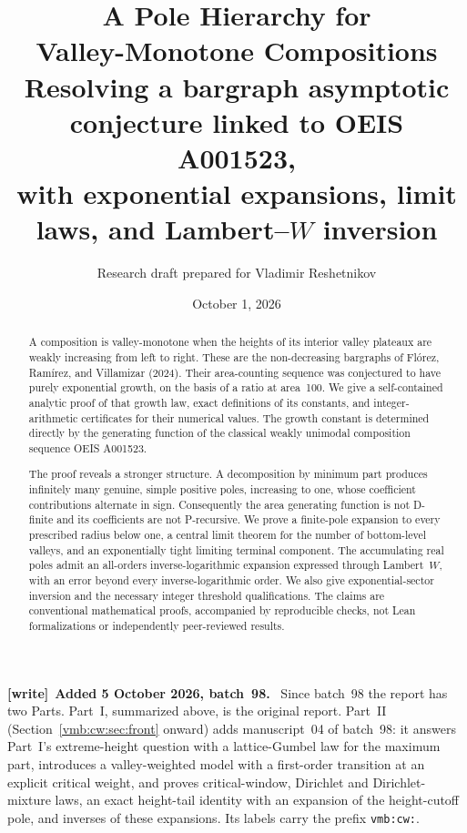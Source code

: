 \documentclass[11pt,a4paper]{article}
\title{\textbf{A Pole Hierarchy for\\Valley-Monotone Compositions}\\[7pt]
\large Resolving a bargraph asymptotic conjecture linked to OEIS A001523,\\
with exponential expansions, limit laws, and Lambert--\(W\) inversion}
\author{Research draft prepared for Vladimir Reshetnikov}
\date{October 1, 2026}
\numberwithin{equation}{section}
\theoremstyle{definition}\newtheorem{definition}[theorem]{Definition}
\theoremstyle{remark}\newtheorem{remark}[theorem]{Remark}
\newenvironment{writenote}[1][]{\par\smallskip\begingroup\small
 \noindent\textbf{[write]}\if\relax\detokenize{#1}\relax\else~\textbf{#1.}\fi\ }%
 {\par\endgroup\smallskip}
\begin{document}
\maketitle
\begin{abstract}
A composition is valley-monotone when the heights of its interior valley
plateaux are weakly increasing from left to right. These are the
non-decreasing bargraphs of Fl\'orez, Ram\'irez, and Villamizar (2024).
Their area-counting sequence was conjectured to have purely exponential
growth, on the basis of a ratio at area~100. We give a self-contained
analytic proof of that growth law, exact definitions of its constants,
and integer-arithmetic certificates for their numerical values.
The growth constant is determined directly by the generating function
of the classical weakly unimodal composition sequence OEIS A001523.

The proof reveals a stronger structure. A decomposition by minimum part
produces infinitely many genuine, simple positive poles, increasing to
one, whose coefficient contributions alternate in sign. Consequently the
area generating function is not D-finite and its coefficients are not
P-recursive. We prove a finite-pole expansion to every prescribed radius
below one, a central limit theorem for the number of bottom-level valleys,
and an exponentially tight limiting terminal component. The accumulating
real poles admit an all-orders inverse-logarithmic expansion expressed
through Lambert~\(W\), with an error beyond every inverse-logarithmic order.
We also give exponential-sector inversion and the necessary integer
threshold qualifications. The claims are conventional mathematical
proofs, accompanied by reproducible checks, not Lean formalizations or
independently peer-reviewed results.
\end{abstract}
\begin{writenote}[Added 5 October 2026, batch~98]
Since batch~98 the report has two Parts. Part~I, summarized above, is the
original report. Part~II (Section~\ref{vmb:cw:sec:front} onward) adds
manuscript~04 of batch~98: it answers Part~I's extreme-height question with
a lattice-Gumbel law for the maximum part, introduces a valley-weighted
model with a first-order transition at an explicit critical weight, and
proves critical-window, Dirichlet and Dirichlet-mixture laws, an exact
height-tail identity with an expansion of the height-cutoff pole, and
inverses of these expansions. Its labels carry the prefix \texttt{vmb:cw:}.
\end{writenote}
\tableofcontents
\newpage
{}
\end{document}
